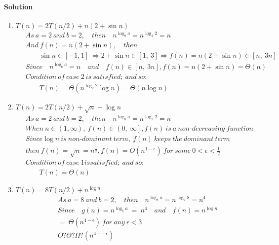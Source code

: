 \documentclass[a4paper]{scrartcl}
\begin{document}
\paragraph{Solution}
\begin{enumerate}[label=(\alph*)]
  \item $T (n) = 2T (n/2) + n(2 + \sin{n})$
\begin{align*}
  &\ As\ a = 2\ and\ b = 2,\quad then \quad n^{\log_b{a}} = n^{\log_2{2}} = n\\
  &\ And\ f(n) = n(2 + \sin{n}),\quad then\\ &\
  \qquad \sin{n} \in \left[-1, 1\right]\ \Rightarrow 2+\sin{n} \in \left[1,\ 3\right] \Rightarrow f(n) = n\left(2 + \sin{n}\right) \in \left[n,\ 3n\right]\\ &\
  Since\quad n^{\log_b{a}} = n \quad and \quad f(n) \in \left[n,\ 3n\right], f(n) = n(2 + \sin{n}) = \Theta(n)\\ &\
  Condition\ of\ case\ 2\ is\ satisfied;\ and\ so:\\
  &\ \qquad T(n)=\Theta\left({n^{\log_2{2}}\log{n}}\right) =\Theta\left({n\log{n}}\right)
\end{align*}
\item $T (n) = 2T (n/2) + \sqrt{n} + \log{n}$
\begin{align*}
  &\ As\ a = 2\ and\ b = 2,\quad then \quad n^{\log_b{a}} = n^{\log_2{2}} = n\\
  &\ When\ n \in \left(1, \infty\right),\ f(n) \in \left(0,\ \infty\right], f(n)\ is\ a\ non\text{-}decreasing\ function\\
  &\ Since \log{n}\ is\ non\text{-}dominant\ term,\ f(n)\ keeps\ the\ dominant\ term\\ &\
  then\ f(n) = \sqrt{n}=n^{\frac{1}{2}}, f(n)=O(n^{1-\epsilon})\ for\ some\ 0< \epsilon < \frac{1}{2}\\ &\
  Condition\ of\ case\ 1 is satisfied;\ and\ so:\\
  &\ \qquad T(n)=\Theta(n)
\end{align*}
\item $T (n) = 8T (n/2) + n^{\log{n}}$
\begin{align*}
  &\ As\ a = 8\ and\ b = 2,\quad then \quad n^{\log_b{a}} = n^{\log_2{8}} = n^4\\ &\
  Since\quad g(n)=n^{\log_b{a}}\ =\ n^4 \quad and \quad f(n) = n^{\log{n}}\\ &\
  =\ \Theta(n^{4-\epsilon})\ for\ any\ \epsilon < 3\\ &\
  O? \Theta ? \Omega ? (n^{4+-\epsilon})
\end{align*}

\end{enumerate}
\end{document}

